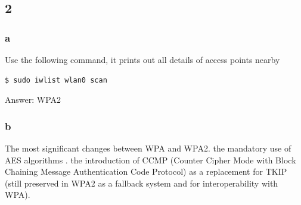 \documentclass{article}
\begin{document}
    \subsection{2}

    \subsubsection{a}
Use the following command, it prints out all details of access points nearby
\begin{verbatim}
$ sudo iwlist wlan0 scan
\end{verbatim}
    Answer: WPA2
    \subsubsection{b}
    The most significant changes between WPA and WPA2. the mandatory use of AES algorithms . the introduction of CCMP (Counter Cipher Mode with Block Chaining Message Authentication Code Protocol) as a replacement for TKIP (still preserved in WPA2 as a fallback system and for interoperability with WPA).
\end{document}
